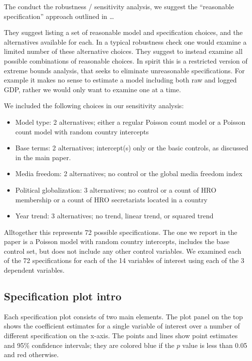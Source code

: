 \documentclass[]{article}
\providecommand{\tightlist}{%
  \setlength{\itemsep}{0pt}\setlength{\parskip}{0pt}}
\begin{document}
The conduct the robustness / sensitivity analysis, we suggest the
``reasonable specification'' approach outlined in \ldots{}

They suggest listing a set of reasonable model and specification
choices, and the alternatives available for each. In a typical
robustness check one would examine a limited number of these alternative
choices. They suggest to instead examine all possible combinations of
reasonable choices. In spirit this is a restricted version of extreme
bounds analysis, that seeks to eliminate unreasonable specifications.
For example it makes no sense to estimate a model including both raw and
logged GDP, rather we would only want to examine one at a time.

We included the following choices in our sensitivity analysis:

\begin{itemize}
\tightlist
\item
  Model type: 2 alternatives; either a regular Poisson count model or a
  Poisson count model with random country intercepts
\item
  Base terms: 2 alternatives; intercept(s) only or the basic controls,
  as discussed in the main paper.
\item
  Media freedom: 2 alternatives; no control or the global media freedom
  index
\item
  Political globalization: 3 alternatives; no control or a count of HRO
  membership or a count of HRO secretariats located in a country
\item
  Year trend: 3 alternatives; no trend, linear trend, or squared trend
\end{itemize}

Alltogether this represents 72 possible specifications. The one we
report in the paper is a Poisson model with random country intercepts,
includes the base control set, but does not include any other control
variables. We examined each of the 72 specifications for each of the 14
variables of interest using each of the 3 dependent variables.

\hypertarget{specification-plot-intro}{%
\subsection{Specification plot intro}\label{specification-plot-intro}}

Each specification plot consists of two main elements. The plot panel on
the top shows the coefficient estimates for a single variable of
interest over a number of different specification on the x-axis. The
points and lines show point estimates and 95\% confidence intervals;
they are colored blue if the \(p\) value is less than 0.05 and red
otherwise.
\end{document}
